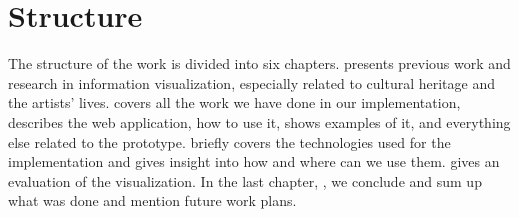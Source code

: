 \section{Structure}\label{sec:structure}
The structure of the work is divided into six chapters.  presents previous work and research in
information visualization, especially related to cultural heritage and the artists' lives.  covers all the
work we have done in our implementation, describes the web application, how to use it, shows examples of it, and everything else
related to the prototype.  briefly covers the technologies used for the implementation and gives insight into how and where
can we use them.  gives an evaluation of the visualization. In the last chapter, , we conclude and sum up
what was done and mention future work plans.
